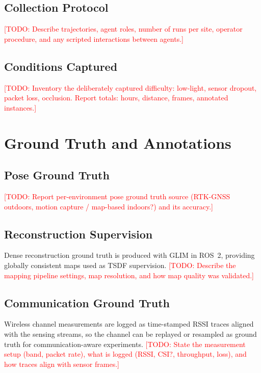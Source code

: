 \documentclass[conference]{IEEEtran}
\newcommand{\todo}[1]{\textcolor{red}{[TODO: #1]}}
\begin{document}
\subsection{Collection Protocol}
\todo{Describe trajectories, agent roles, number of runs per site, operator
procedure, and any scripted interactions between agents.}

\subsection{Conditions Captured}
\todo{Inventory the deliberately captured difficulty: low-light, sensor
dropout, packet loss, occlusion. Report totals: hours, distance, frames,
annotated instances.}

\section{Ground Truth and Annotations}
\label{sec:groundtruth}

\subsection{Pose Ground Truth}
\todo{Report per-environment pose ground truth source (RTK-GNSS outdoors,
motion capture / map-based indoors?) and its accuracy.}

\subsection{Reconstruction Supervision}
Dense reconstruction ground truth is produced with GLIM \cite{glim} in
ROS~2, providing globally consistent maps used as TSDF supervision.
\todo{Describe the mapping pipeline settings, map resolution, and how map
quality was validated.}

\subsection{Communication Ground Truth}
Wireless channel measurements are logged as time-stamped RSSI traces
aligned with the sensing streams, so the channel can be replayed or
resampled as ground truth for communication-aware experiments.
\todo{State the measurement setup (band, packet rate), what is logged
(RSSI, CSI?, throughput, loss), and how traces align with sensor frames.}
\end{document}
